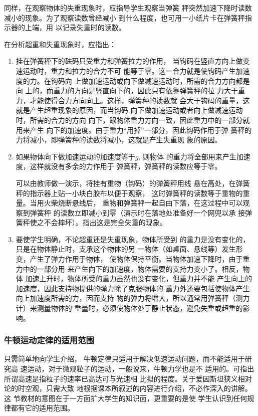 同样，在观察物体的失重现象时，应指导学生观察当弹簧
秤突然加速下降时读数减小的现象。为了观察读数曾经减小
到什么程度，也可用一小纸片卡在弹簧秤指示器的上端，用
以记录失重时的读数。

在分析超重和失重现象时，应指出：

\begin{enumerate}
    \item 挂在弹簧秤下的砝码只受重力和弹簧拉力的作用，
当钩码在竖直方向上做变速运动时，重力和拉力的合力不可
能等于零。这一合力就是使钩码产生加速度的力。在钩码向
上做加速运动或向下做减速运动时，所需的合力方向都是向
上的，而重力的方向是竖直向下的，因此只有依靠弹簧秤的拉
力大于重力，才能使得合力方向向上。这样，弹簧秤的读数就
会大于钩码的重量，这就是产生超重现象的原因，而当钩码
向下做加速运动或者向上做减速运动时，所需的合力的方向
向下，跟物体重力方向一致，因此重力中的一部分就用来产生
向下的加速度。由于重力“用掉”一部分，因此钩码作用于弹
簧秤的力将减小，即弹簧秤的读数将减小，这就是产生失重现
象的原因。
\item 如果物体向下做加速运动的加速度等于$g$, 则物体
的重力将全部用来产生加速度，这样就没有多余的力作用于
弹簧秤，弹簧秤的读数应等于零。

可以由教师做一演示，将挂有重物（钩码）的弹簧秤用线
悬在高处，在弹簧秤的指示器上贴一小块白胶布以便于观察，
这时弹簧秤的读数等于重物的重量。当用火柴烧断悬线后，
重物和弹簧秤一起自由下落，在这过程中可以观察到弹簧秤
的读数立即减小到零（演示时在落地处准备好一个网兜以承
接弹簧秤使之不会摔坏）。指出这是完全失重的现象。

\item 要使学生明确，不论超重还是失重现象，物体所受到
的重力是没有变化的，只是在物体静止时，支承这个物体的另
一物体（如桌面、悬线等）发生形变，产生了弹力作用于物体，
使物体保持平衡。当物体加速下降时，由于重力中的一部分用
来产生向下的加速度，物体需要的支持力变小了。相反，物体
加速上升时，物体所受的重力虽然也没有变化，但重力并不能
产生向上的加速度，因此支持物提供的弹力除了克服物体的
重力外还要包括使物体产生向上加速度所需的力，因而支持
物的弹力将增大，所以通常用弹簧秤（测力计）来测量物体的
重量时，必须使物体处于静止状态，避免失重或超重的影响。
\end{enumerate}

\subsubsection{牛顿运动定律的适用范围}

只需简单地向学生介绍，
牛顿定律只适用于解决低速运动问题，而不能适用于研究高
速运动，对于微观粒子的运动，一般说来，牛顿力学也是不
适用的。可指出所谓高速是指粒子的速率已高达可与光速相
比拟的程度。关于爱因斯坦狭义相对论的时空观，只需大致
地根据课本所叙述的内容进行介绍，不必作深入的讲解。这
节教材的意图在于一方面扩大学生的知识面，更重要的是使
学生认识到任何规律都有它的适用范围。


